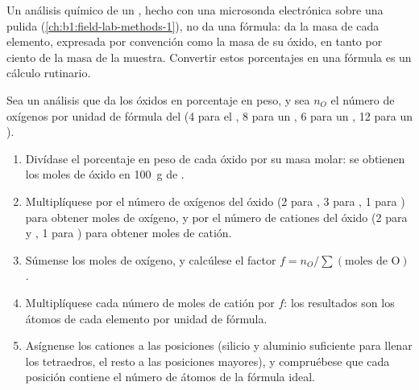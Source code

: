 Un análisis químico de un , hecho con una microsonda electrónica sobre una  pulida
(\cref{ch:b1:field-lab-methods-1}), no da una fórmula: da la masa de cada elemento, expresada por convención
como la masa de su óxido, en tanto por ciento de la masa de la muestra. Convertir estos porcentajes en una
fórmula es un cálculo rutinario.

\begin{method}\label{met:b1:rock-forming-minerals:recalculation}
Sea un análisis que da los óxidos en porcentaje en peso, y sea $n_O$ el número de oxígenos por unidad de
fórmula del  (4 para el , 8 para un , 6 para un , 12 para un ).
\begin{enumerate}
  \item Divídase el porcentaje en peso de cada óxido por su masa molar: se obtienen los moles de óxido en
        \qty{100}{g} de .
  \item Multiplíquese por el número de oxígenos del óxido (2 para , 3 para , 1 para
        ) para obtener moles de oxígeno, y por el número de cationes del óxido (2 para  y
        , 1 para ) para obtener moles de catión.
  \item Súmense los moles de oxígeno, y calcúlese el factor $f = n_O / \sum(\text{moles de O})$.
  \item Multiplíquese cada número de moles de catión por $f$: los resultados son los átomos de cada
        elemento por unidad de fórmula.
  \item Asígnense los cationes a las posiciones (silicio y aluminio suficiente para llenar los tetraedros, el
        resto a las posiciones mayores), y compruébese que cada posición contiene el número de átomos de la
        fórmula ideal.
\end{enumerate}
\end{method}

